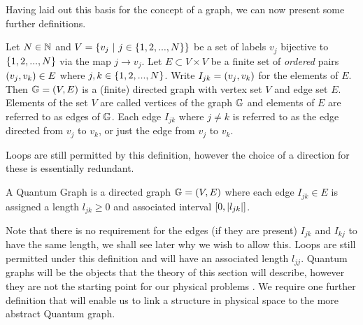 Having laid out this basis for the concept of a graph, we can now present some further definitions.
\begin{definition} \label{def:DirectedGraph}
	Let $N\in\mathbb{N}$ and $V=\clbracs{v_j \ \vert \ j\in\clbracs{1,2,...,N}}$ be a set of labels $v_j$ bijective to $\left\{ 1,2,...,N \right\}$ via the map $j\rightarrow v_j$.
	Let $E\subset V\times V$ be a finite set of \textit{ordered} pairs $\left( v_j,v_k \right)\in E$ where $j,k\in\left\{ 1,2,...,N \right\}$.
	Write $I_{jk} = \left( v_j,v_k \right)$ for the elements of $E$.
	Then $\mathbb{G}=\left( V,E \right)$ is a (finite) directed graph with vertex set $V$ and edge set $E$.
	Elements of the set $V$ are called vertices of the graph $\mathbb{G}$ and elements of $E$ are referred to as edges of $\mathbb{G}$.
	Each edge $I_{jk}$ where $j\neq k$ is referred to as the edge directed from $v_j$ to $v_k$, or just the edge from $v_j$ to $v_k$.
\end{definition}
Loops are still permitted by this definition, however the choice of a direction for these is essentially redundant.
\begin{definition} \label{def:QuantumGraph}
	A Quantum Graph is a directed graph $\mathbb{G} = \left( V,E \right)$ where each edge $I_{jk}\in E$ is assigned a length $l_{jk}\geq0$ and associated interval $\left[ 0,\left\lvert l_{jk} \right\rvert \right]$.
\end{definition}
Note that there is no requirement for the edges (if they are present) $I_{jk}$ and $I_{kj}$ to have the same length, we shall see later why we wish to allow this.
Loops are still permitted under this definition and will have an associated length $l_{jj}$.
Quantum graphs will be the objects that the theory of this section will describe, however they are not the starting point for our physical problems .
We require one further definition that will enable us to link a structure in physical space to the more abstract Quantum graph.

